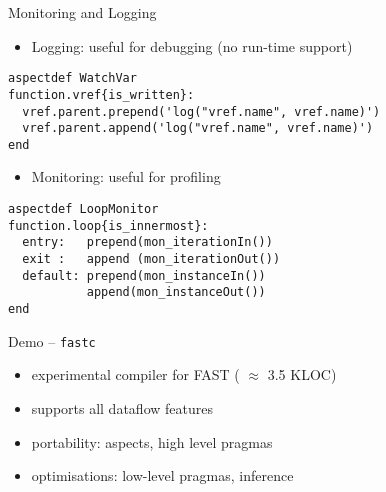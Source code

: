\begin{frame}[fragile]{Monitoring and Logging}
  \begin{itemize}
  \item Logging: useful for debugging (no run-time support)
  \end{itemize}
  \begin{lstlisting}[label=lst:label, style=lara]
aspectdef WatchVar
function.vref{is_written}:
  vref.parent.prepend('log("vref.name", vref.name)')
  vref.parent.append('log("vref.name", vref.name)')
end
  \end{lstlisting}

  \begin{itemize}
  \item Monitoring: useful for profiling
  \end{itemize}
  \begin{lstlisting}[label=lst:label, style=lara]
aspectdef LoopMonitor
function.loop{is_innermost}:
  entry:   prepend(mon_iterationIn())
  exit :   append (mon_iterationOut())
  default: prepend(mon_instanceIn())
           append(mon_instanceOut())
end
  \end{lstlisting}
\end{frame}

\begin{frame}{Demo -- \texttt{fastc}}
  \begin{figure}[!ht]
    \centering
    \def\svgwidth{\linewidth}
    
  \end{figure}
  \begin{itemize}
    \setlength{\itemsep}{10pt}
  \item experimental compiler for FAST ( $\approx$ 3.5 KLOC)
  \item supports all dataflow features
  \item portability: aspects, high level pragmas
  \item optimisations: low-level pragmas, inference
  \end{itemize}
\end{frame}
